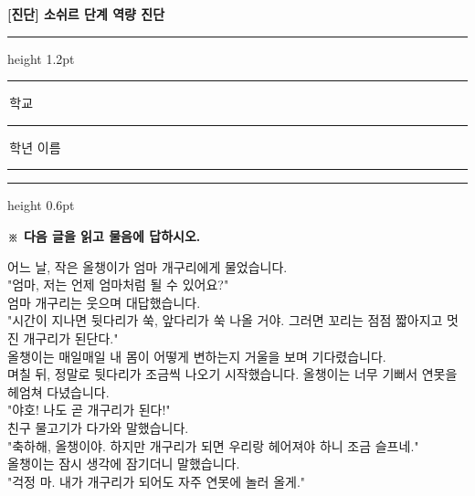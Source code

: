 \documentclass[12pt,a4paper]{article}
\begin{document}
\begin{center}
{\Large\bfseries [진단] 소쉬르 단계 역량 진단}
\end{center}
\vspace{3mm}
{\color{korfarmBrown}\hrule height 1.2pt}
\vspace{4mm}
\hfill\rule{3.5cm}{0.4pt}\,학교\hspace{10mm}%
\rule{2cm}{0.4pt}\,학년\hspace{10mm}%
이름\,\rule{3.5cm}{0.4pt}
\vspace{4mm}
{\color{korfarmBrown}\hrule height 0.6pt}
\vspace{3mm}

\noindent{}
\vspace{4mm}
\vspace{4mm}
{\small\textbf{※ 다음 글을 읽고 물음에 답하시오.}}
\vspace{2mm}
\begin{tcolorbox}[passage]
어느 날, 작은 올챙이가 엄마 개구리에게 물었습니다. \\{}
"엄마, 저는 언제 엄마처럼 될 수 있어요?" \\{}
엄마 개구리는 웃으며 대답했습니다. \\{}
"시간이 지나면 뒷다리가 쑥, 앞다리가 쑥 나올 거야. 그러면 꼬리는 점점 짧아지고 멋진 개구리가 된단다." \\{}
올챙이는 매일매일 내 몸이 어떻게 변하는지 거울을 보며 기다렸습니다. \\{}
며칠 뒤, 정말로 뒷다리가 조금씩 나오기 시작했습니다. 올챙이는 너무 기뻐서 연못을 헤엄쳐 다녔습니다. \\{}
"야호! 나도 곧 개구리가 된다!" \\{}
친구 물고기가 다가와 말했습니다. \\{}
"축하해, 올챙이야. 하지만 개구리가 되면 우리랑 헤어져야 하니 조금 슬프네." \\{}
올챙이는 잠시 생각에 잠기더니 말했습니다. \\{}
"걱정 마. 내가 개구리가 되어도 자주 연못에 놀러 올게."
\end{tcolorbox}
\end{document}
